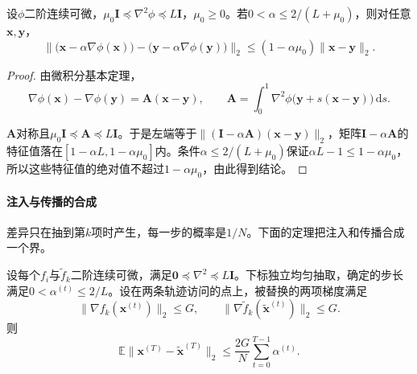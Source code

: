 \begin{lemma}[梯度步的非扩张与压缩]
\label{lem:sgdb-nonexpansive}
设$\phi$二阶连续可微，$\mu_0\bm{I}\preceq\nabla^2\phi\preceq L\bm{I}$，$\mu_0\geq0$。若$0<\alpha\leq2/(L+\mu_0)$，则对任意$\bm{x},\bm{y}$，
\begin{equation}
 \bigl\lVert\bigl(\bm{x}-\alpha\nabla\phi(\bm{x})\bigr)-\bigl(\bm{y}-\alpha\nabla\phi(\bm{y})\bigr)\bigr\rVert_2\leq(1-\alpha\mu_0)\lVert\bm{x}-\bm{y}\rVert_2 .
 \label{eq:sgdb-nonexpansive}
\end{equation}
\end{lemma}

\begin{proof}
由微积分基本定理，
\[
 \nabla\phi(\bm{x})-\nabla\phi(\bm{y})=\bm{A}(\bm{x}-\bm{y}),\qquad
 \bm{A}=\int_0^1\nabla^2\phi\bigl(\bm{y}+s(\bm{x}-\bm{y})\bigr)\,\mathrm{d}s .
\]

$\bm{A}$对称且$\mu_0\bm{I}\preceq\bm{A}\preceq L\bm{I}$。于是左端等于$\lVert(\bm{I}-\alpha\bm{A})(\bm{x}-\bm{y})\rVert_2$，矩阵$\bm{I}-\alpha\bm{A}$的特征值落在$[1-\alpha L,1-\alpha\mu_0]$内。条件$\alpha\leq2/(L+\mu_0)$保证$\alpha L-1\leq1-\alpha\mu_0$，所以这些特征值的绝对值不超过$1-\alpha\mu_0$，由此得到结论。
\end{proof}

\paragraph{注入与传播的合成}
差异只在抽到第$k$项时产生，每一步的概率是$1/N$。下面的定理把注入和传播合成一个界。

\begin{theorem}[样本替换下的期望参数距离]
\label{thm:sgdb-stability}
设每个$f_i$与$\tilde f_k$二阶连续可微，满足$\bm{0}\preceq\nabla^2\preceq L\bm{I}$。下标独立均匀抽取，确定的步长满足$0<\alpha^{(t)}\leq2/L$。设在两条轨迹访问的点上，被替换的两项梯度满足
\begin{equation}
 \lVert\nabla f_k(\bm{x}^{(t)})\rVert_2\leq G,\qquad \lVert\nabla\tilde f_k(\tilde{\bm x}^{(t)})\rVert_2\leq G .
 \label{eq:sgdb-stability-condition}
\end{equation}
则
\begin{equation}
 \mathbb{E}\lVert\bm{x}^{(T)}-\tilde{\bm x}^{(T)}\rVert_2\leq\frac{2G}{N}\sum_{t=0}^{T-1}\alpha^{(t)} .
 \label{eq:sgdb-stability}
\end{equation}
\end{theorem}


